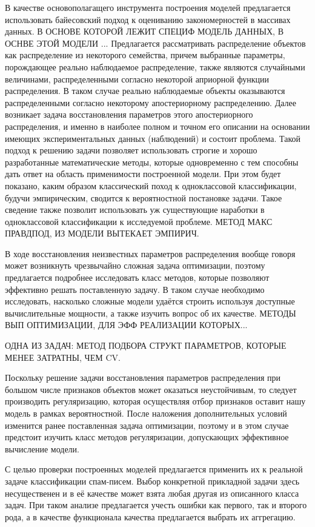 \documentclass[12pt,a4paper]{article}
\newcommand\nameofpart[1]{\noindent\maintext{#1}\par}
\begin{document}
	\nameofpart{Предлагаемые методы и подходы}
	 В качестве основополагащего инструмента построения моделей предлагается использовать байесовский подход к оцениванию закономерностей в массивах данных. В ОСНОВЕ КОТОРОЙ ЛЕЖИТ СПЕЦИФ МОДЕЛЬ ДАННЫХ, В ОСНВЕ ЭТОЙ МОДЕЛИ ...
	Предлагается рассматривать распределение объектов как распределение из некоторого семейства, причем выбранные параметры, порождающее реально наблюдаемое распределение, также являются случайными величинами, распределенными согласно некоторой априорной функции распределения. 
	В таком случае реально наблюдаемые объекты оказываются распределенными согласно некоторому апостериорному распределению. 
	Далее возникает задача восстановления параметров этого апостериорного распределения, и именно в наиболее полном и точном его описании на основании имеющих экспериментальных данных (наблюдений) и состоит проблема. 
	Такой подход к решению задачи позволяет использовать строгие и хорошо разработанные математические методы, которые одновременно с тем способны дать ответ на область применимости построенной модели.
	При этом будет показано, каким образом классический поход к одноклассовой классификации, будучи эмпирическим, сводится к вероятностной постановке задачи. 
	Такое сведение также позволит использовать уж существующие наработки в одноклассовой классификации к исследуемой проблеме.
	МЕТОД МАКС ПРАВДПОД, ИЗ МОДЕЛИ ВЫТЕКАЕТ ЭМПИРИЧ.

	 В ходе восстановления неизвестных параметров распределения вообще говоря может возникнуть чрезвычайно сложная задача оптимизации, поэтому предлагается подробнее исследовать класс методов, которые позволяют эффективно решать поставленную задачу. 
	В таком случае необходимо исследовать, насколько сложные модели удаётся строить используя доступные вычислительные мощности, а также изучить вопрос об их качестве.
	МЕТОДЫ ВЫП ОПТИМИЗАЦИИ, ДЛЯ ЭФФ РЕАЛИЗАЦИИ КОТОРЫХ...
	
	ОДНА ИЗ ЗАДАЧ: МЕТОД ПОДБОРА СТРУКТ ПАРАМЕТРОВ, КОТОРЫЕ МЕНЕЕ ЗАТРАТНЫ, ЧЕМ CV.

	 Поскольку решение задачи восстановления параметров распределения при большом числе признаков объектов может оказаться неустойчивым, то следует производить регуляризацию, которая осуществляя отбор признаков оставит нашу модель в рамках вероятностной. 
	После наложения дополнительных условий изменится ранее поставленная задача оптимизации, поэтому и в этом случае предстоит изучить класс методов регуляризации, допускающих эффективное вычисление модели.

	 С целью проверки построенных моделей предлагается применить их к реальной задаче классификации спам-писем. 
	Выбор конкретной прикладной задачи здесь несущественен и в её качестве может взята любая другая из описанного класса задач. 
	При таком анализе предлагается учесть ошибки как первого, так и второго рода, а в качестве функционала качества предлагается выбрать их аггрегацию.
\end{document}
